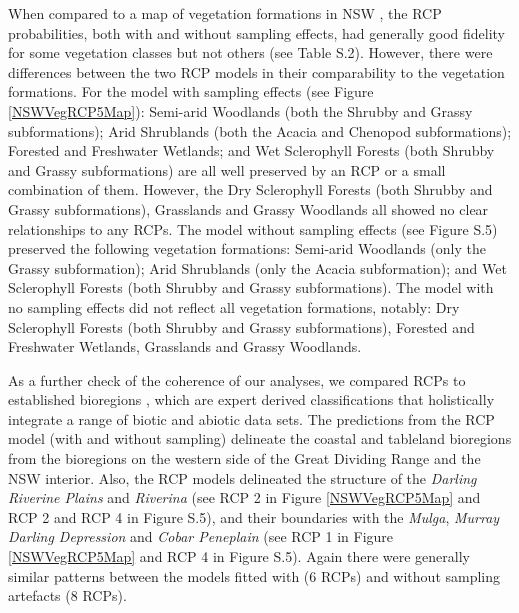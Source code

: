 \documentclass{statsoc}
\begin{document}
When compared to a map of vegetation formations in NSW \citep[][a classification based on an almagamation of many local to regional scale vegetation maps]{kei12}, the RCP probabilities, both with and without sampling effects, had generally good fidelity for some vegetation classes but not others (see Table S.2). However, there were differences between the two RCP models in their comparability to the vegetation formations. For the model with sampling effects (see Figure \ref{NSWVegRCP5Map}): Semi-arid Woodlands (both the Shrubby and Grassy subformations); Arid Shrublands (both the Acacia and Chenopod subformations); Forested and Freshwater Wetlands; and Wet Sclerophyll Forests (both Shrubby and Grassy subformations) are all well preserved by an RCP or a small combination of them. However, the Dry Sclerophyll Forests (both Shrubby and Grassy subformations), Grasslands and Grassy Woodlands all showed no clear relationships to any RCPs. The model without sampling effects (see Figure S.5) preserved the following vegetation formations: Semi-arid Woodlands (only the Grassy subformation); Arid Shrublands (only the Acacia subformation); and Wet Sclerophyll Forests (both Shrubby and Grassy subformations). The model with no sampling effects did not reflect all vegetation formations, notably: Dry Sclerophyll Forests (both Shrubby and Grassy subformations), Forested and Freshwater Wetlands, Grasslands and Grassy Woodlands. 


As a further check of the coherence of our analyses, we compared RCPs to established bioregions \citep{tha97}, which are expert derived classifications that holistically integrate a range of biotic and abiotic data sets. The predictions from the RCP model (with and without sampling) delineate the coastal and tableland bioregions from the bioregions on the western side of the Great Dividing Range and the NSW interior. Also, the RCP models delineated the structure of the \textit{Darling Riverine Plains} and \textit{Riverina} (see RCP 2 in Figure \ref{NSWVegRCP5Map} and RCP 2 and RCP 4 in Figure S.5), and their boundaries with the \textit{Mulga}, \textit{Murray Darling Depression} and \textit{Cobar Peneplain} (see RCP 1 in Figure \ref{NSWVegRCP5Map} and RCP 4 in Figure S.5). Again there were generally similar patterns between the models fitted with (6 RCPs) and without sampling artefacts (8 RCPs).
\end{document}
